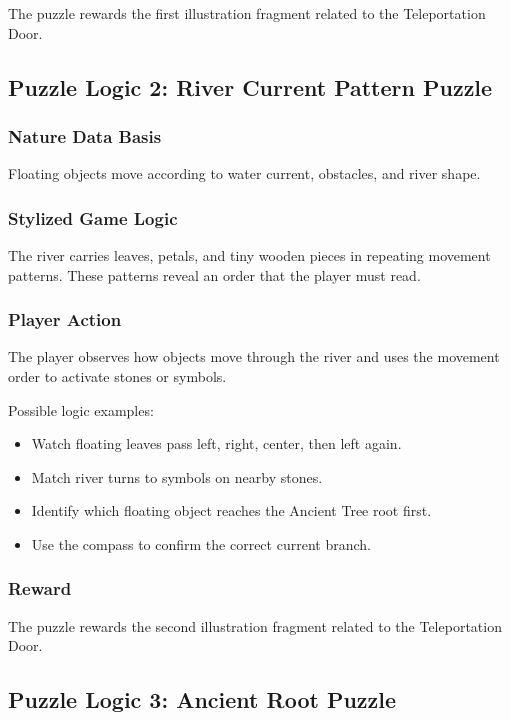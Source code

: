 \documentclass[12pt]{article}
\begin{document}
The puzzle rewards the first illustration fragment related to the Teleportation Door.

\subsection{Puzzle Logic 2: River Current Pattern Puzzle}

\subsubsection{Nature Data Basis}

Floating objects move according to water current, obstacles, and river shape.

\subsubsection{Stylized Game Logic}

The river carries leaves, petals, and tiny wooden pieces in repeating movement patterns. These patterns reveal an order that the player must read.

\subsubsection{Player Action}

The player observes how objects move through the river and uses the movement order to activate stones or symbols.

Possible logic examples:

\begin{itemize}[leftmargin=*]
    \item Watch floating leaves pass left, right, center, then left again.
    \item Match river turns to symbols on nearby stones.
    \item Identify which floating object reaches the Ancient Tree root first.
    \item Use the compass to confirm the correct current branch.
\end{itemize}

\subsubsection{Reward}

The puzzle rewards the second illustration fragment related to the Teleportation Door.

\subsection{Puzzle Logic 3: Ancient Root Puzzle}
\end{document}
